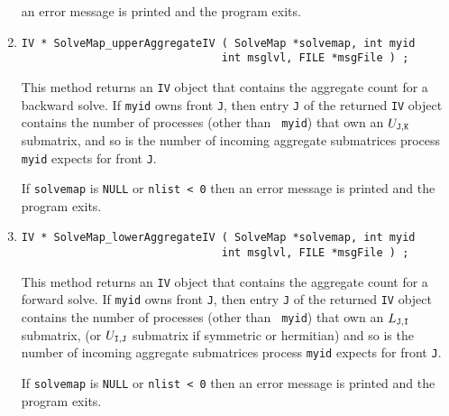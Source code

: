 \begin{enumerate}
an error message is printed and the program exits.
\item
\begin{verbatim}
IV * SolveMap_upperAggregateIV ( SolveMap *solvemap, int myid
                               int msglvl, FILE *msgFile ) ;
\end{verbatim}
This method returns an {\tt IV} object that contains the aggregate
count for a backward solve.
If {\tt myid} owns front {\tt J}, then entry {\tt J} of the returned 
{\tt IV} object contains the number of processes (other than {\tt
myid}) that own an $U_{\tt J,K}$ submatrix, and so is the number of
incoming aggregate submatrices process {\tt myid} expects for front
{\tt J}.
\par {}
If {\tt solvemap} is {\tt NULL} or {\tt nlist < 0} then 
an error message is printed and the program exits.
\item
\begin{verbatim}
IV * SolveMap_lowerAggregateIV ( SolveMap *solvemap, int myid
                               int msglvl, FILE *msgFile ) ;
\end{verbatim}
This method returns an {\tt IV} object that contains the aggregate
count for a forward solve.
If {\tt myid} owns front {\tt J}, then entry {\tt J} of the returned 
{\tt IV} object contains the number of processes (other than {\tt
myid}) that own an $L_{\tt J,I}$ submatrix, (or $U_{\tt I,J}$ submatrix
if symmetric or hermitian) and so is the number of
incoming aggregate submatrices process {\tt myid} expects for front
{\tt J}.
\par {}
If {\tt solvemap} is {\tt NULL} or {\tt nlist < 0} then 
an error message is printed and the program exits.
\end{enumerate}
\par
